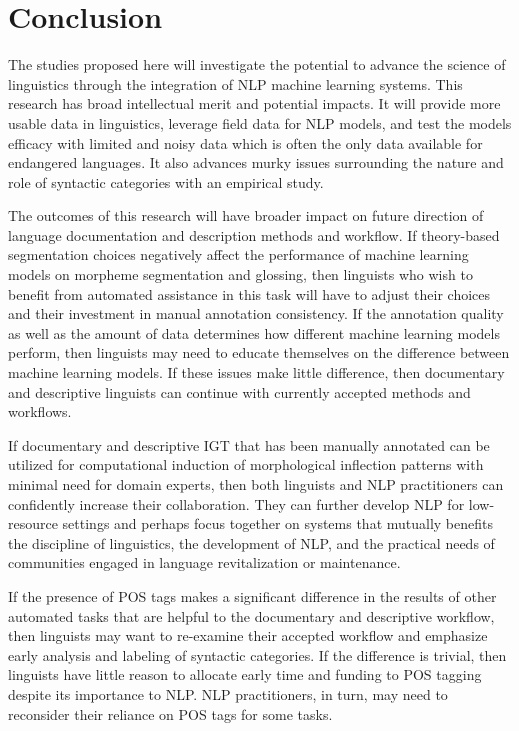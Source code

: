 \chapter{Conclusion}
\label{chap:conclusion}

The studies proposed here will investigate the potential to advance the science of linguistics through the integration of NLP machine learning systems. This research has broad intellectual merit and potential impacts. It will provide more usable data in linguistics, leverage field data for NLP models, and test the models efficacy with limited and noisy data which is often the only data available for endangered languages. It also advances murky issues surrounding the nature and role of syntactic categories with an empirical study.

The outcomes of this research will have broader impact on future direction of language documentation and description methods and workflow. If theory-based segmentation choices negatively affect the performance of machine learning models on morpheme segmentation and glossing, then linguists who wish to benefit from automated assistance in this task will have to adjust their choices and their investment in manual annotation consistency. If the annotation quality as well as the amount of data determines how different machine learning models perform, then linguists may need to educate themselves on the difference between machine learning models. If these issues make little difference, then documentary and descriptive linguists can continue with currently accepted methods and workflows.

If documentary and descriptive IGT that has been manually annotated can be utilized for computational induction of morphological inflection patterns with minimal need for domain experts, then both linguists and NLP practitioners can confidently increase their collaboration. They can further develop NLP for low-resource settings and perhaps focus together on systems that mutually benefits the discipline of linguistics, the development of NLP, and the practical needs of communities engaged in language revitalization or maintenance. 

If the presence of POS tags makes a significant difference in the results of other automated tasks that are helpful to the documentary and descriptive workflow, then linguists may want to re-examine their accepted workflow and emphasize early analysis and labeling of syntactic categories. If the difference is trivial, then linguists have little reason to allocate early time and funding to POS tagging despite its importance to NLP. NLP practitioners, in turn, may need to reconsider their reliance on POS tags for some tasks. 

